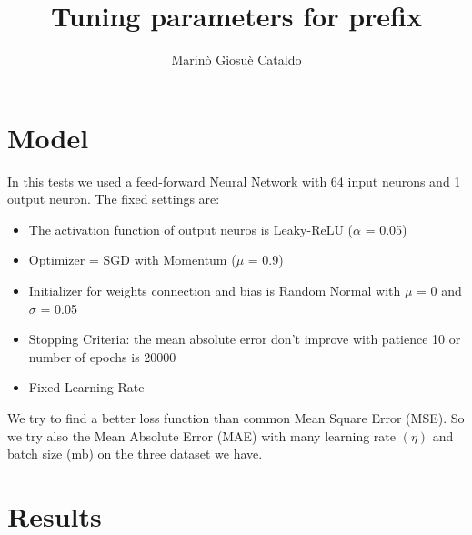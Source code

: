 \documentclass[10pt]{article}
\begin{document}
\title{Tuning parameters for prefix}


\author[$1$]{Marinò Giosuè Cataldo}

\maketitle

\section{Model}
	In this tests we used a feed-forward Neural Network with 64 input neurons and 1 output neuron.
	The fixed settings are:	
	\begin{itemize}
		\item The activation function of output neuros is Leaky-ReLU ($\alpha$ = 0.05)
		\item Optimizer = SGD with Momentum ($\mu$ = 0.9)
		\item Initializer for weights connection and bias is Random Normal with $\mu$ = 0 and $\sigma$ = 0.05
		\item Stopping Criteria: the mean absolute error don't improve with patience 10 or number of epochs is 20000
		\item Fixed Learning Rate
	\end{itemize}
	We try to find a better loss function than common Mean Square Error (MSE). So we try also the Mean Absolute Error (MAE) with many learning rate $(\eta)$ and batch size (mb) on the three dataset we have.
\section{Results}
\end{document}

